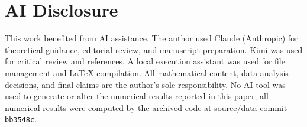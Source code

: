 \section{AI Disclosure}
This work benefited from AI assistance. The author used Claude
(Anthropic) for theoretical guidance, editorial review, and
manuscript preparation. Kimi was used for critical review and
references. A local execution assistant was used for file
management and LaTeX compilation. All mathematical content, data
analysis decisions, and final claims are the author's sole
responsibility. No AI tool was used to generate or alter the
numerical results reported in this paper; all numerical results
were computed by the archived code at source/data commit \texttt{bb3548c}.
